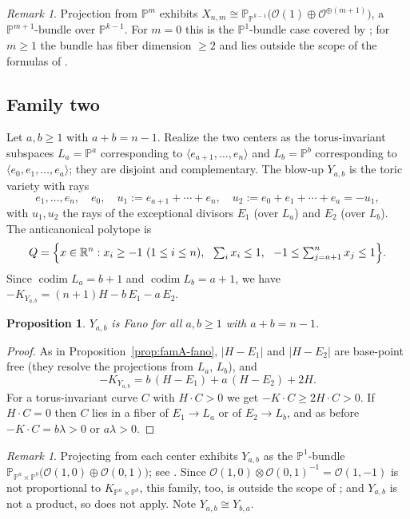 \documentclass[11pt]{amsart}
\newtheorem{proposition}[theorem]{Proposition}
\theoremstyle{definition}
\theoremstyle{remark}
\newtheorem{remark}[theorem]{Remark}
\newcommand{\PP}{\mathbb{P}}
\newcommand{\RR}{\mathbb{R}}
\begin{document}
\begin{remark}\label{rem:bundleA}
Projection from $\PP^m$ exhibits
$X_{n,m}\cong\PP_{\PP^{k-1}}\bigl(\mathcal O(1)\oplus\mathcal
O^{\oplus (m+1)}\bigr)$, a $\PP^{m+1}$-bundle over $\PP^{k-1}$. For
$m=0$ this is the $\PP^1$-bundle case covered by \cite{ZZ21}; for
$m\ge1$ the bundle has fiber dimension $\ge 2$ and lies outside the
scope of the formulas of \cite{ZZ21,BMY24}.
\end{remark}

\subsection{Family two}\label{subsec:famB}
Let $a,b\ge1$ with $a+b=n-1$. Realize the two centers as the
torus-invariant subspaces
$L_a=\PP^a$ corresponding to $\langle e_{a+1},\dots,e_n\rangle$ and
$L_b=\PP^b$ corresponding to $\langle e_0,e_1,\dots,e_a\rangle$; they
are disjoint and complementary. The blow-up $Y_{a,b}$ is the toric
variety with rays
\[
e_1,\dots,e_n,\quad e_0,\quad
u_1:=e_{a+1}+\cdots+e_n,\quad
u_2:=e_0+e_1+\cdots+e_a=-u_1 ,
\]
with $u_1,u_2$ the rays of the exceptional divisors $E_1$ (over $L_a$)
and $E_2$ (over $L_b$). The anticanonical polytope is
\begin{equation}\label{eq:PB}
Q=\Bigl\{x\in\RR^n:
x_i\ge-1\ (1\le i\le n),\ \ 
\textstyle\sum_{i} x_i\le 1,\ \ 
-1\le\textstyle\sum_{j=a+1}^{n}x_j\le 1\Bigr\}.
\end{equation}
Since $\operatorname{codim}L_a=b+1$ and $\operatorname{codim}L_b=a+1$,
we have $-K_{Y_{a,b}}=(n+1)H-b\,E_1-a\,E_2$.

\begin{proposition}\label{prop:famB-fano}
$Y_{a,b}$ is Fano for all $a,b\ge1$ with $a+b=n-1$.
\end{proposition}

\begin{proof}
As in Proposition~\ref{prop:famA-fano}, $|H-E_1|$ and $|H-E_2|$ are
base-point free (they resolve the projections from $L_a$, $L_b$), and
\[
-K_{Y_{a,b}}=b\,(H-E_1)+a\,(H-E_2)+2H .
\]
For a torus-invariant curve $C$ with $H\cdot C>0$ we get
$-K\cdot C\ge 2H\cdot C>0$. If $H\cdot C=0$ then $C$ lies in a fiber of
$E_1\to L_a$ or of $E_2\to L_b$, and as before
$-K\cdot C=b\lambda>0$ or $a\lambda>0$.
\end{proof}

\begin{remark}
Projecting from each center exhibits $Y_{a,b}$ as the $\PP^1$-bundle
$\PP_{\PP^a\times\PP^b}\bigl(\mathcal O(1,0)\oplus\mathcal
O(0,1)\bigr)$; see \cite[\S2]{Delcroix22}. Since
$\mathcal O(1,0)\otimes \mathcal O(0,1)^{-1}=\mathcal O(1,-1)$ is not
proportional to $K_{\PP^a\times\PP^b}$, this family, too, is outside
the scope of \cite{ZZ21}; and $Y_{a,b}$ is not a product, so
\cite{Zhuang20} does not apply. Note $Y_{a,b}\cong Y_{b,a}$.
\end{remark}
\end{document}
